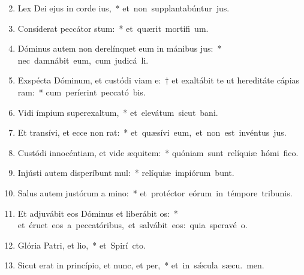 \begin{flushleft}
\begin{enumerate}[leftmargin=*]
\setcounter{enumi}{1}

\item Lex Dei ejus in corde ius,~* \mbox{et non supplantabúntur  jus.}
\item Consíderat peccátor stum:~* \mbox{et quærit mortifi um.}
\item Dóminus autem non derelínquet eum in mánibus jus:~* \mbox{nec damnábit eum, cum judicá li.}
\item Exspécta Dóminum, et custódi viam e:~† et exaltábit te ut hereditáte cápias ram:~* \mbox{cum períerint peccató bis.}
\item Vidi ímpium superexaltum,~* \mbox{et elevátum sicut  bani.}
\item Et transívi, et ecce non rat:~* \mbox{et quæsívi eum, et non est invéntus  jus.}
\item Custódi innocéntiam, et vide æquitem:~* \mbox{quóniam sunt relíquiæ hómi fico.}
\item Injústi autem disperíbunt mul:~* \mbox{relíquiæ impiórum bunt.}
\item Salus autem justórum a mino:~* \mbox{et protéctor eórum in témpore tribunis.}
\item Et adjuvábit eos Dóminus et liberábit os:~* \mbox{et éruet eos a peccatóribus, et salvábit eos: quia speravé  o.}
\item Glória Patri, et lio,~* \mbox{et Spirí cto.}
\item Sicut erat in princípio, et nunc, et per,~* \mbox{et in s\'{\ae}cula sæcu. men.}

\end{enumerate}
\end{flushleft}

